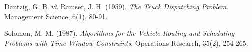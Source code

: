 \documentclass[13pt, a4paper]{extarticle} %
\begin{document}
\newpage
\begin{thebibliography}{}

Dantzig, G. B. và Ramser, J. H. (1959). \textit{The Truck Dispatching Problem}. Management Science, 6(1), 80-91.

Solomon, M. M. (1987). \textit{Algorithms for the Vehicle Routing and Scheduling Problems with Time Window Constraints}. Operations Research, 35(2), 254-265.

\end{thebibliography}
\end{document}
